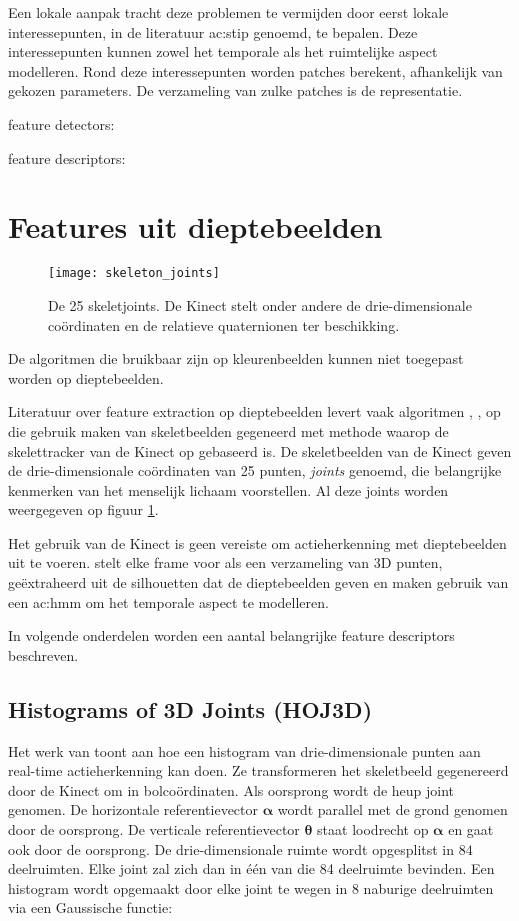 Een lokale aanpak tracht deze problemen te vermijden door eerst lokale interessepunten, in de literatuur \gls{ac:stip} genoemd, te bepalen. Deze interessepunten kunnen zowel het temporale als het ruimtelijke aspect modelleren. Rond deze interessepunten worden patches berekent, afhankelijk van gekozen parameters. De verzameling van zulke patches is de representatie. 
 
feature detectors:

feature descriptors:
 
\section{Features uit dieptebeelden}
\begin{figure}
	\centering
	\texttt{[image: skeleton\_joints]}
	\caption{De 25 skeletjoints. De Kinect stelt onder andere de drie-dimensionale coördinaten en de relatieve quaternionen ter beschikking.}
	\label{fig:skeleton_joints}
\end{figure}
De algoritmen die bruikbaar zijn op kleurenbeelden kunnen niet toegepast worden op dieptebeelden. 

Literatuur over feature extraction op dieptebeelden levert vaak algoritmen \cite{Xia2012}, \cite{Wang2012b}, \cite{Yang2012} op die gebruik maken van skeletbeelden gegeneerd met methode \cite{Shotton2011} waarop de skelettracker van de Kinect op gebaseerd is. De skeletbeelden van de Kinect geven de drie-dimensionale coördinaten van 25 punten, \textit{joints} genoemd, die belangrijke kenmerken van het menselijk lichaam voorstellen. Al deze joints worden weergegeven op figuur \ref{fig:skeleton_joints}.

Het gebruik van de Kinect is geen vereiste om actieherkenning met dieptebeelden uit te voeren. \cite{Li2010} stelt elke frame voor als een verzameling van 3D punten, geëxtraheerd uit de silhouetten dat de dieptebeelden geven en maken gebruik van een \gls{ac:hmm} om het temporale aspect te modelleren. \cite{Wang2012a} 

In volgende onderdelen worden een aantal belangrijke feature descriptors beschreven.
\subsection{Histograms of 3D Joints (HOJ3D)}
Het werk van \cite{Xia2012} toont aan hoe een histogram van drie-dimensionale punten aan real-time actieherkenning kan doen. Ze transformeren het skeletbeeld gegenereerd door de Kinect om in bolcoördinaten. Als oorsprong wordt de heup joint genomen. De horizontale referentievector $\mathbf{\alpha}$ wordt parallel met de grond genomen door de oorsprong. De verticale referentievector $\mathbf{\theta}$ staat loodrecht op $\mathbf{\alpha}$ en gaat ook door de oorsprong. De drie-dimensionale ruimte wordt opgesplitst in $84$ deelruimten. Elke joint zal zich dan in één van die 84 deelruimte bevinden. Een histogram wordt opgemaakt door elke joint te wegen in 8 naburige deelruimten via een Gaussische functie:


